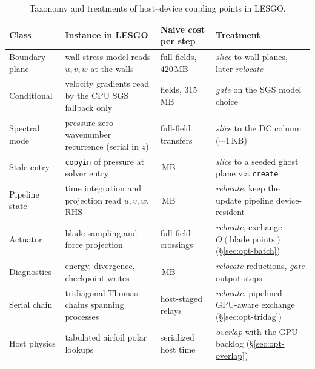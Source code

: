\begin{table}[t]
  \centering
  \caption{Taxonomy and treatments of host--device coupling points in LESGO.
  }
  \label{tab:taxonomy}
  \footnotesize
  \renewcommand{\arraystretch}{1.2}
  \begin{tabular}{@{}
    >{\raggedright\arraybackslash}p{0.75in}
    >{\raggedright\arraybackslash}p{2.5in}
    >{\raggedright\arraybackslash}p{1.00in}
    >{\raggedright\arraybackslash}p{2.25in}@{}}
  \toprule
  Class & Instance in LESGO & Naive cost per step & Treatment \\
  \midrule
  Boundary plane & wall-stress model reads $u,v,w$ at the walls &
  full fields, 420\,MB & \emph{slice} to wall planes, later
  \emph{relocate} \\
  Conditional & velocity gradients read by the CPU SGS fallback only &
  9 fields, 315\,MB & \emph{gate} on the SGS model choice \\
  Spectral mode & pressure zero-wavenumber recurrence (serial in $z$) &
  3 full-field transfers & \emph{slice} to the DC column
  ($\sim$1\,KB) \\
  Stale entry & \texttt{copyin} of pressure at solver entry &
  34\,MB & \emph{slice} to a seeded ghost plane via \texttt{create} \\
  Pipeline state & time integration and projection read $u,v,w$, RHS &
  210\,MB & \emph{relocate}, keep the update pipeline
  device-resident \\
  Actuator & blade sampling and force projection & 2 full-field
  crossings & \emph{relocate}, exchange $O(\text{blade points})$
  (\S\ref{sec:opt-batch}) \\
  Diagnostics & energy, divergence, checkpoint writes & 963\,MB 
  & \emph{relocate} reductions, \emph{gate} output
  steps \\
  Serial chain & tridiagonal Thomas chains spanning processes &
  host-staged relays & \emph{relocate}, pipelined GPU-aware exchange
  (\S\ref{sec:opt-tridag}) \\
  Host physics & tabulated airfoil polar lookups & serialized host time
  & \emph{overlap} with the GPU backlog (\S\ref{sec:opt-overlap}) \\
  \bottomrule
  \end{tabular}
  \vspace{-0.1in}
  \end{table}

